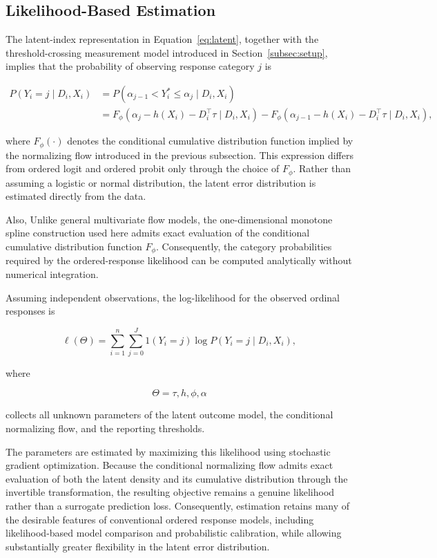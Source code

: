 \documentclass{article}
\begin{document}
\subsection{Likelihood-Based Estimation}
\label{subsec:likelihood}

The latent-index representation in Equation~\eqref{eq:latent}, together with the threshold-crossing measurement model introduced in Section~\ref{subsec:setup}, implies that the probability of observing response category $j$ is

\[
\begin{aligned}
P(Y_i=j\mid D_i,X_i) &= P\left( \alpha_{j-1} < Y_i^\ast \le \alpha_j \mid D_i,X_i \right) \\
&= F_\phi \left( \alpha_j - h(X_i) - D_i^\top\tau \mid D_i,X_i \right)
- F_\phi \left( \alpha_{j-1} - h(X_i) - D_i^\top\tau \mid D_i,X_i \right),
\end{aligned}
\]

where $F_\phi(\cdot)$ denotes the conditional cumulative distribution function implied by the normalizing flow introduced in the previous subsection. This expression differs from ordered logit and ordered probit only through the choice of $F_\phi$. Rather than assuming a logistic or normal distribution, the latent error distribution is estimated directly from the data. 

Also, Unlike general multivariate flow models, the one-dimensional monotone spline construction used here admits exact evaluation of the conditional cumulative distribution function $F_\phi$. Consequently, the category probabilities required by the ordered-response likelihood can be computed analytically without numerical integration.

Assuming independent observations, the log-likelihood for the observed ordinal responses is

\[
\ell(\Theta) = \sum_{i=1}^{n} \sum_{j=0}^{J} 1(Y_i=j) \log P(Y_i=j\mid D_i,X_i),
\]

where

\[
\Theta = { \tau, h, \phi, \alpha }
\]

collects all unknown parameters of the latent outcome model, the conditional normalizing flow, and the reporting thresholds.

The parameters are estimated by maximizing this likelihood using stochastic gradient optimization. Because the conditional normalizing flow admits exact evaluation of both the latent density and its cumulative distribution through the invertible transformation, the resulting objective remains a genuine likelihood rather than a surrogate prediction loss. Consequently, estimation retains many of the desirable features of conventional ordered response models, including likelihood-based model comparison and probabilistic calibration, while allowing substantially greater flexibility in the latent error distribution.
\end{document}
